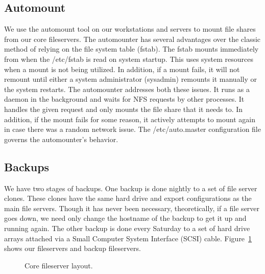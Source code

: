 \subsection{Automount}
We use the automount tool on our workstations and servers to mount file shares from our core fileservers.  The automounter has several advantages over the classic method of relying on the file system table (fstab).  The fstab mounts immediately from when the /etc/fstab is read on system startup.  This uses system resources when a mount is not being utilized.  In addition, if a mount fails, it will not remount until either a system administrator (sysadmin) remounts it manually or the system restarts.  The automounter addresses both these issues.  It runs as a daemon in the background and waits for NFS requests by other processes.  It handles the given request and only mounts the file share that it needs to.  In addition, if the mount fails for some reason, it actively attempts to mount again in case there was a random network issue.  The /etc/auto.master configuration file governs the automounter's behavior.

\subsection{Backups}
We have two stages of backups.  One backup is done nightly to a set of file server clones.  These clones have the same hard drive and export configurations as the main file servers.  Though it has never been necessary, theoretically, if a file server goes down, we need only change the hostname of the backup to get it up and running again.  The other backup is done every Saturday to a set of hard drive arrays attached via a Small Computer System Interface (SCSI) cable.  Figure~\ref{fig:FileserverLayout} shows our fileservers and backup fileservers.

\begin{figure}
  \begin{center}
  \end{center}
  \caption{Core fileserver layout.}
  \label{fig:FileserverLayout}
\end{figure}

